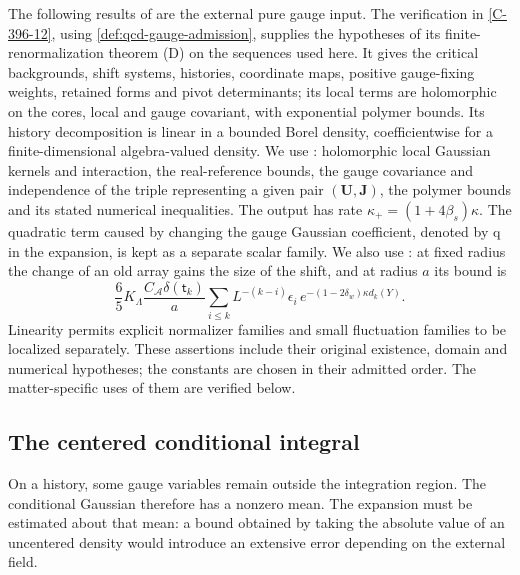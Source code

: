 \documentclass[11pt,letterpaper,reqno]{amsart}
\theoremstyle{definition}
\theoremstyle{remark}
\begin{document}
The following results of \cite{YMM1} are the external pure gauge
input. The verification in \cref{C-396-12}, using
\cref{def:qcd-gauge-admission}, supplies the hypotheses of its
finite-renormalization theorem (D) on the sequences used here.
It gives the critical backgrounds, shift systems, histories,
coordinate maps, positive gauge-fixing weights, retained
forms and pivot determinants; its local terms are
holomorphic on the cores, local and gauge covariant, with
exponential polymer bounds. Its history decomposition is
linear in a bounded Borel density, coefficientwise for a
finite-dimensional algebra-valued density.
We use \cite[Theorem~V and Definition~52.1]{YMM1}: holomorphic local Gaussian
kernels and interaction, the real-reference bounds, the
gauge covariance and independence of the triple representing
a given pair $(\mathbf U,\mathbf J)$, the polymer
bounds and its stated numerical inequalities. The output
has rate $\kappa_+=(1+4\beta_s)\kappa$. The quadratic
term caused by changing the gauge Gaussian coefficient,
denoted by q in the expansion, is kept as a separate scalar family.
We also use \cite[Proposition~51.16]{YMM1}: at fixed radius the change of an old array gains
the size of the shift, and at radius $a$ its bound is
\[
 \frac65K_\Lambda\frac{C_{\mathcal A}\delta(\mathsf t_k)}a
 \sum_{i\le k}L^{-(k-i)}\epsilon_i\,
 e^{-(1-2\delta_w)\kappa d_k(Y)}.
\]
Linearity permits explicit normalizer families and small
fluctuation families to be localized separately.
These assertions include their original existence, domain
and numerical hypotheses; the constants are chosen in
their admitted order. The matter-specific uses of them
are verified below.

\subsection{The centered conditional integral}

On a history, some gauge variables remain outside the integration
region. The conditional Gaussian therefore has a nonzero mean.
The expansion must be estimated about that mean: a bound obtained
by taking the absolute value of an uncentered density would introduce
an extensive error depending on the external field.
\end{document}
